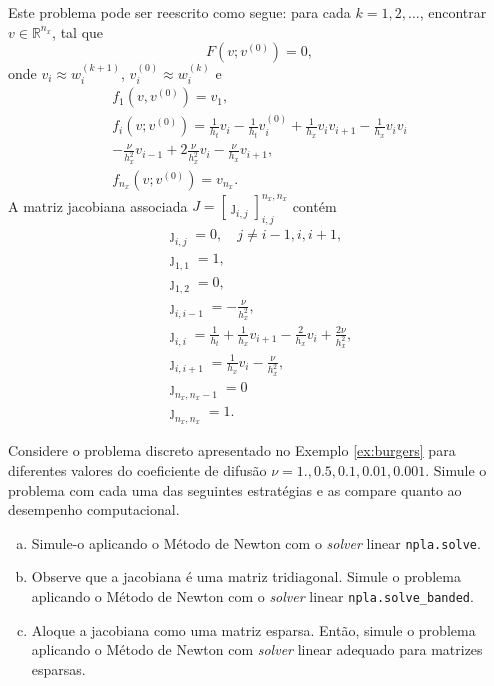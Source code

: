 \begin{ex}
  Este problema pode ser reescrito como segue: para cada $k=1,2,\ldots$, encontrar $v\in\mathbb{R}^{n_x}$, tal que
  \begin{equation}
    F(v; v^{(0)}) = 0, 
  \end{equation}
  onde $v_{i} \approx w^{(k+1)}_i$, $v_{i}^{(0)} \approx w^{(k)}_{i}$ e
  \begin{gather}
    f_1(v,v^{(0)}) = v_1,\\
    f_{i}(v;v^{(0)}) = \frac{1}{h_t}v_i - \frac{1}{h_t}v^{(0)}_i + \frac{1}{h_x}v_iv_{i+1} - \frac{1}{h_x}v_iv_i \\
    - \frac{\nu}{h_x^2}v_{i-1} + 2\frac{\nu}{h_x^2}v_i - \frac{\nu}{h_x}v_{i+1},\\
    f_{n_x}(v;v^{(0)}) = v_{n_x}.
  \end{gather}
  A matriz jacobiana associada $J=[\jmath_{i,j}]_{i,j}^{n_x,n_x}$ contém
  \begin{gather}
    \jmath_{i,j} = 0,\quad j\neq i-1,i,i+1,\\
    \jmath_{1,1} = 1,\\
    \jmath_{1,2} = 0,\\
    \jmath_{i,i-1} = -\frac{\nu}{h_x^2},\\
    \jmath_{i,i} = \frac{1}{h_t} + \frac{1}{h_x}v_{i+1} - \frac{2}{h_x}v_i + \frac{2\nu}{h_x^2},\\
    \jmath_{i,i+1} = \frac{1}{h_x}v_{i} - \frac{\nu}{h_x^2},\\
    \jmath_{n_x,n_x-1} = 0\\
    \jmath_{n_x,n_x} = 1.
  \end{gather}
\end{ex}

\begin{exer}\label{exer:burgers}
  Considere o problema discreto apresentado no Exemplo \ref{ex:burgers} para diferentes valores do coeficiente de difusão $\nu=1., 0.5, 0.1, 0.01, 0.001$. Simule o problema com cada uma das seguintes estratégias e as compare quanto ao desempenho computacional.
  \begin{enumerate}[a)]
  \item Simule-o aplicando o Método de Newton com o {\it solver} linear \lstinline+npla.solve+.
  \item Observe que a jacobiana é uma matriz tridiagonal. Simule o problema aplicando o Método de Newton com o {\it solver} linear \lstinline+npla.solve_banded+.
  \item Aloque a jacobiana como uma matriz esparsa. Então, simule o problema aplicando o Método de Newton com {\it solver} linear adequado para matrizes esparsas.
  \end{enumerate}
\end{exer}

